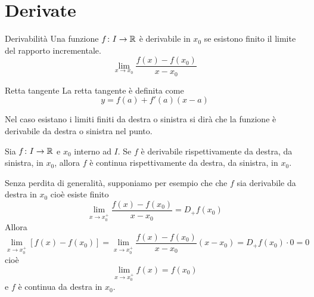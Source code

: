 \documentclass[a4paper]{article}
\begin{document}
\pagebreak

\section{Derivate}

\begin{radioactive}
\begin{snippetdefinition}{Derivabilità}
    Una funzione \(f\colon I \to \mathbb{R}\) è derivabile in \(x_0\) se esistono finito il limite del rapporto incrementale.
    \[
        \lim_{x\to x_0} \frac{f(x) - f(x_0)}{x-x_0}
    \]
\end{snippetdefinition}

\begin{snippetdefinition}{Retta tangente}
    La retta tangente è definita come
    \[
        y = f(a) + f'(a)(x-a)
    \]
\end{snippetdefinition}

Nel caso esistano i limiti finiti da destra o sinistra si dirà che la funzione è derivabile
da destra o sinistra nel punto.
\end{radioactive}

\begin{snippetproposition}{}
    Sia \(f\colon I \to \mathbb{R}\) e \(x_0\) interno ad \(I\).
    Se \(f\) è derivabile rispettivamente da destra, da sinistra, in \(x_0\),
    allora \(f\) è continua rispettivamente da destra, da sinistra, in \(x_0\).
\end{snippetproposition}

\begin{snippetproof}{}
    Senza perdita di generalità, supponiamo per esempio che  che \(f\) sia derivabile da destra in \(x_0\)
    cioè esiste finito
    \[
        \lim_{x\to x_0^+} \frac{f(x) - f(x_0)}{x-x_0} = D_+ f(x_0)
    \]
    Allora
    \[
        \lim_{x\to x_0^+} \left[f(x) - f(x_0)\right]
        = \lim_{x \to x_0^+} \frac{f(x) - f(x_0)}{x-x_0} (x-x_0)
        = D_+f(x_0) \cdot 0 = 0
    \]
    cioè
    \[
        \lim_{x\to x_0^+} f(x) = f(x_0)
    \]
    e \(f\) è continua da destra in \(x_0\).
\end{snippetproof}
\end{document}
